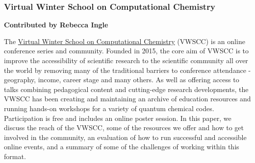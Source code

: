\subsubsection{Virtual Winter School on Computational Chemistry}

\textbf{Contributed by Rebecca Ingle}

The \href{https://winterschool.cc}{Virtual Winter School on Computational Chemistry} (VWSCC) is an online conference series and community. Founded in 2015, the core aim of VWSCC is to improve the accessibility of scientific research to the scientific community all over the world by removing many of the traditional barriers to conference attendance - geography, income, career stage and many others. As well as offering access to talks combining pedagogical content and cutting-edge research developments, the VWSCC has been creating and maintaining an archive of education resources and running hands-on workshops for a variety of quantum chemical codes.  Participation is free and includes an online poster session. In this paper\cite{ROOS2020112975}, we discuss the reach of the VWSCC, some of the resources we offer and how to get involved in the community, an evaluation of how to run successful and accessible online events, and a summary of some of the challenges of working within this format.